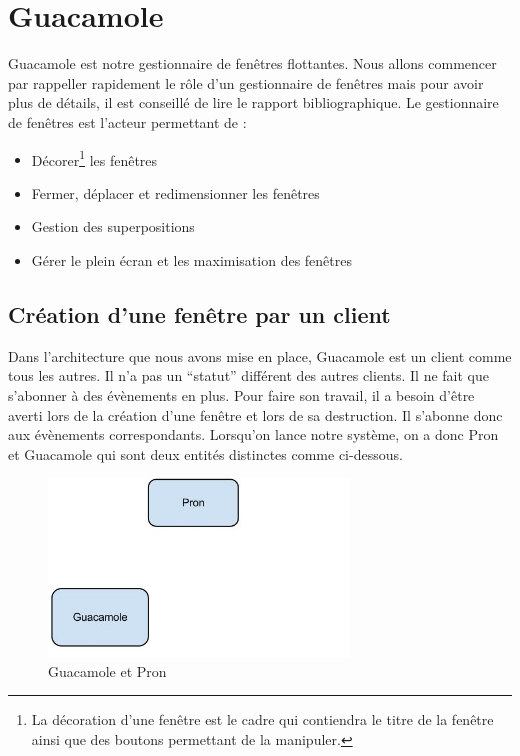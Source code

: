 \section{Guacamole}

Guacamole est notre gestionnaire de fenêtres flottantes.
Nous allons commencer par rappeller rapidement le rôle d'un gestionnaire de fenêtres mais pour avoir plus de détails, il est conseillé de lire le rapport bibliographique.
Le gestionnaire de fenêtres est l'acteur permettant de :

\begin{itemize}
  \item Décorer\footnote{La décoration d'une fenêtre est le cadre qui contiendra le titre de la fenêtre ainsi que des boutons permettant de la manipuler.} les fenêtres
  \item Fermer, déplacer et redimensionner les fenêtres
  \item Gestion des superpositions
  \item Gérer le plein écran et les maximisation des fenêtres
\end{itemize}

\subsection{Création d'une fenêtre par un client}


Dans l'architecture que nous avons mise en place, Guacamole est un client comme tous les autres.
Il n'a pas un ``statut'' différent des autres clients.
Il ne fait que s'abonner à des évènements en plus.
Pour faire son travail, il a besoin d'être averti lors de la création d'une fenêtre et lors de sa destruction.
Il s'abonne donc aux évènements correspondants.
Lorsqu'on lance notre système, on a donc Pron et Guacamole qui sont deux entités distinctes comme ci-dessous.

\begin{figure}[H]
  \centering
  \includegraphics[width=8cm]{images/Guacamole_anim_1.jpg}
  \caption{Guacamole et Pron}
  \label{fig:guacamole_anim_1}
\end{figure}

